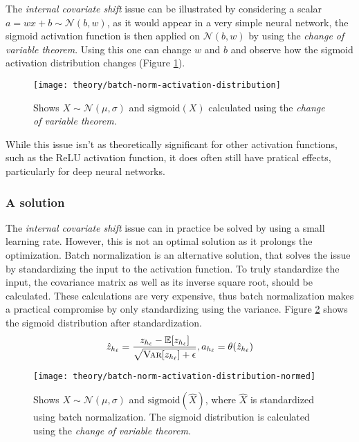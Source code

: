 The \textit{internal covariate shift} issue can be illustrated by considering a scalar $a = w x + b \sim \mathcal{N}(b, w)$, as it would appear in a very simple neural network, the sigmoid activation function is then applied on $\mathcal{N}(b, w)$ by using the \textit{change of variable theorem}. Using this one can change $w$ and $b$ and observe how the sigmoid activation distribution changes (Figure \ref{fig:convergence:batch-norm:activation-distribution}).

\begin{figure}[h]
	\centering
	\texttt{[image: theory/batch-norm-activation-distribution]}
	\caption{Shows $X \sim \mathcal{N}(\mu, \sigma)$ and $\mathrm{sigmoid}(X)$ calculated using the \textit{change of variable theorem}.}
	\label{fig:convergence:batch-norm:activation-distribution}
\end{figure}

While this issue isn't as theoretically significant for other activation functions, such as the ReLU activation function, it does often still have pratical effects, particularly for deep neural networks.

\subsubsection{A solution}
The \textit{internal covariate shift} issue can in practice be solved by using a small learning rate. However, this is not an optimal solution as it prolongs the optimization. Batch normalization is an alternative solution, that solves the issue by standardizing the input to the activation function. To truly standardize the input, the covariance matrix as well as its inverse square root, should be calculated. These calculations are very expensive, thus batch normalization makes a practical compromise by only standardizing using the variance. Figure \ref{fig:convergence:batch-norm:activation-distribution-normed} shows the sigmoid distribution after standardization.
\begin{equation}
\hat{z}_{h_\ell} = \frac{z_{h_\ell} - \mathbb{E}[z_{h_\ell}]}{\sqrt{\textsc{Var}[z_{h_\ell}] + \epsilon}}, a_{h_\ell} = \theta(\hat{z}_{h_\ell})
\end{equation}

\begin{figure}[h]
	\centering
	\texttt{[image: theory/batch-norm-activation-distribution-normed]}
	\caption{Shows $X \sim \mathcal{N}(\mu, \sigma)$ and $\mathrm{sigmoid}(\hat{X})$, where $\hat{X}$ is standardized using batch normalization. The sigmoid distribution is calculated using the \textit{change of variable theorem}.}
	\label{fig:convergence:batch-norm:activation-distribution-normed}
\end{figure}

